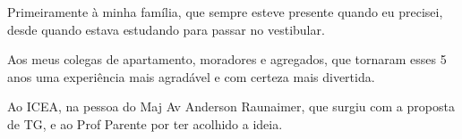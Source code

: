 Primeiramente à minha família, que sempre esteve presente quando eu precisei, desde quando estava estudando para passar no vestibular.

Aos meus colegas de apartamento, moradores e agregados, que tornaram esses 5 anos uma experiência mais agradável e com certeza mais divertida.

Ao ICEA, na pessoa do Maj Av Anderson Raunaimer, que surgiu com a proposta de TG, e ao Prof Parente por ter acolhido a ideia.